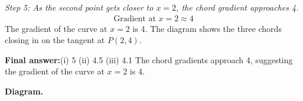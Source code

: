 \documentclass[11pt]{article}
\begin{document}
\textit{Step 5: As the second point gets closer to \( x = 2 \), the chord gradient approaches 4.}
\[\begin{gathered}
\text{Gradient at } x = 2 \approx 4
\end{gathered}\]
The gradient of the curve at \( x = 2 \) is 4. The diagram shows the three chords closing in on the tangent at \( P(2,4) \).

\begin{answerbox}
\textbf{Final answer:}\quad (i) 5 \quad  (ii) 4.5 \quad  (iii) 4.1 \quad  The chord gradients approach 4, suggesting the gradient of the curve at \(\displaystyle  x = 2 \) is 4.
\end{answerbox}
\textbf{Diagram.}

\begin{center}
\end{center}
\end{document}
